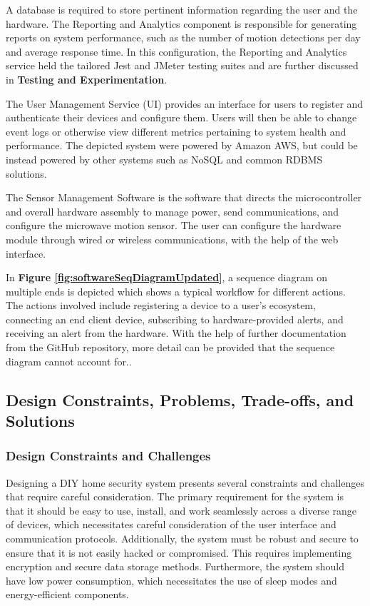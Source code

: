 A database is required to store pertinent information regarding the user and the hardware. The
Reporting and Analytics component is responsible for generating reports on system performance,
such as the number of motion detections per day and average response time. In this
configuration, the Reporting and Analytics service held the tailored Jest and JMeter testing
suites and are further discussed in \textbf{Testing and Experimentation}.



The User Management Service (UI) provides an interface for users to register and
authenticate their devices and configure them. Users will then be able to change event logs or
otherwise view different metrics pertaining to system health and performance. The depicted
system were powered by Amazon AWS, but could be instead powered by other systems such as NoSQL
and common RDBMS solutions.

The Sensor Management Software is the software that directs the microcontroller and overall hardware assembly to manage power, send communications, and configure the microwave motion sensor. The user can configure the hardware module through wired or wireless communications, with the help of the web interface.



In \textbf{Figure \ref{fig:softwareSeqDiagramUpdated}}, a sequence diagram on multiple ends is depicted which shows a typical workflow for different actions. The actions involved include registering a device to a user's ecosystem, connecting an end client device, subscribing to hardware-provided alerts, and receiving an alert from the hardware. With the help of further documentation from the GitHub repository, more detail can be provided that the sequence diagram cannot account for..\cite{MorteSense-2023}

\subsection{Design Constraints, Problems, Trade-offs, and Solutions}\label{subsec:design-constraints-problems-trade-offs-and-solutions}

\subsubsection{Design Constraints and Challenges}

Designing a DIY home security system presents several constraints and challenges that
require careful consideration. The primary requirement for the system is that it should be
easy to use, install, and work seamlessly across a diverse range of devices, which
necessitates careful consideration of the user interface and communication protocols.
Additionally, the system must be robust and secure to ensure that it is not easily
hacked or compromised. This requires implementing encryption and secure data storage methods.
Furthermore, the system should have low power consumption, which necessitates the use of sleep
modes and energy-efficient components.

